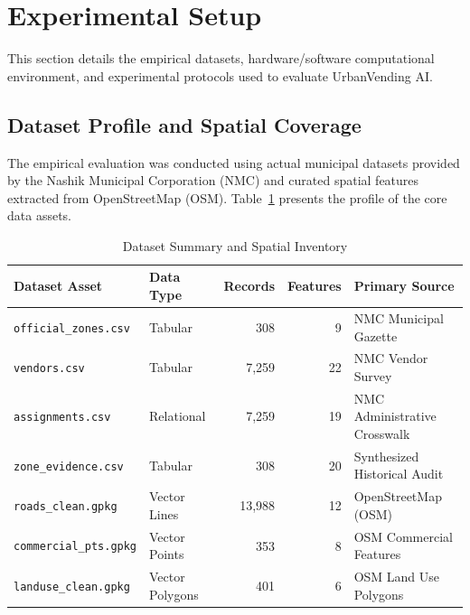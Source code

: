 \section{Experimental Setup}
\label{sec:experimental_setup}

This section details the empirical datasets, hardware/software computational environment, and experimental protocols used to evaluate UrbanVending AI.

\subsection{Dataset Profile and Spatial Coverage}
\label{sec:setup_data}

The empirical evaluation was conducted using actual municipal datasets provided by the Nashik Municipal Corporation (NMC) and curated spatial features extracted from OpenStreetMap (OSM). Table~\ref{tab:dataset_summary} presents the profile of the core data assets.

\begin{table}[t]
    \caption{Dataset Summary and Spatial Inventory}
    \label{tab:dataset_summary}
    \centering
    \begin{tabular}{llrrl}
        \toprule
        \textbf{Dataset Asset} & \textbf{Data Type} & \textbf{Records} & \textbf{Features} & \textbf{Primary Source} \\
        \midrule
        \texttt{official\_zones.csv} & Tabular & 308 & 9 & NMC Municipal Gazette \\
        \texttt{vendors.csv} & Tabular & 7,259 & 22 & NMC Vendor Survey \\
        \texttt{assignments.csv} & Relational & 7,259 & 19 & NMC Administrative Crosswalk \\
        \texttt{zone\_evidence.csv} & Tabular & 308 & 20 & Synthesized Historical Audit \\
        \texttt{roads\_clean.gpkg} & Vector Lines & 13,988 & 12 & OpenStreetMap (OSM) \\
        \texttt{commercial\_pts.gpkg} & Vector Points & 353 & 8 & OSM Commercial Features \\
        \texttt{landuse\_clean.gpkg} & Vector Polygons & 401 & 6 & OSM Land Use Polygons \\
        \bottomrule
    \end{tabular}
\end{table}

